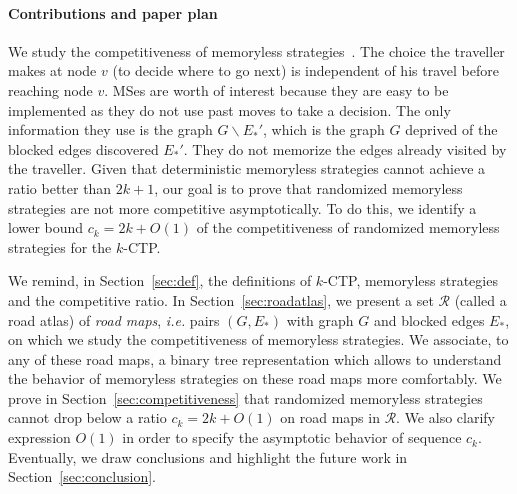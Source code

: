 \documentclass[preprint]{elsarticle}
\newcommand{\kctp}{$k$-CTP}
\newcommand{\mts}{MS}
\begin{document}
\paragraph{Contributions and paper plan}
We study the competitiveness of memoryless strategies~\cite{Al03,BoEl98}. The choice the traveller makes at node $v$ (to decide where to go next) is independent of his travel before reaching node $v$. \mts es are worth of interest because they are easy to be implemented as they do not use past moves to take a decision. The only information they use is the graph $G\backslash E_*'$, which is the graph $G$ deprived of the blocked edges discovered $E_*'$. They do not memorize the edges already visited by the traveller.
Given that deterministic memoryless strategies cannot achieve a ratio better than $2k+1$, our goal is to prove that randomized memoryless strategies are not more competitive asymptotically. To do this, we identify a lower bound $c_k = 2k + O\left(1\right)$ of the competitiveness of randomized memoryless strategies for the \kctp.

We remind, in Section~\ref{sec:def}, the definitions of \kctp , memoryless strategies and the competitive ratio.
In Section~\ref{sec:roadatlas}, we present a set $\mathcal{R}$ (called a road atlas) of \textit{road maps}, {\em i.e.} pairs $\left(G,E_*\right)$ with graph $G$ and blocked edges $E_*$, on which we study the competitiveness of memoryless strategies. We associate, to any of these road maps, a binary tree representation which allows to understand the behavior of memoryless strategies on these road maps more comfortably.
We prove in Section~\ref{sec:competitiveness} that randomized memoryless strategies cannot drop below a ratio $c_k = 2k+O\left(1\right)$ on road maps in $\mathcal{R}$. We also clarify expression $O\left(1\right)$ in order to specify the asymptotic behavior of sequence $c_k$.
Eventually, we draw conclusions and highlight the future work in Section~\ref{sec:conclusion}.
\end{document}
